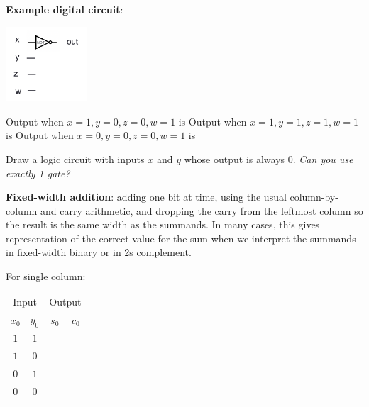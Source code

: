 \documentclass[12pt, oneside]{article}
\begin{document}
\vspace{-40pt}

{\bf Example digital circuit}: 

\begin{multicols}{2}
\begin{center}
   \includegraphics[width=1.2in]{../Resources/images/circuitEx.png} 
\end{center}
\columnbreak
Output when $x=1, y=0, z=0, w = 1$ is \underline{\phantom{$~~~0~~~$}}
Output when $x=1, y=1, z=1, w = 1$ is \underline{\phantom{$~~~0~~~$}}
Output when $x=0, y=0, z=0, w = 1$ is \underline{\phantom{$~~~0~~~$}}
\end{multicols}



Draw a logic circuit with inputs $x$ and $y$ whose output  is always $0$.  {\it  Can you use exactly 1 gate?}


\vspace{40pt}

{\bf Fixed-width addition}: adding one bit at time, using the usual column-by-column and carry arithmetic, and dropping the carry from the leftmost column so the result is the same width as the summands.  In many cases, this gives representation of the correct value for the sum when we interpret the summands
in fixed-width binary or in 2s complement.

For single column:
\begin{center}
\begin{tabular}{cc|cc}
\multicolumn{2}{c|}{Input}  & \multicolumn{2}{|c}{Output}  \\
$x_0$ & $y_0$ & $s_0$ & $c_0$  \\
\hline
$1$ & $1$ & \phantom{$0$} & \phantom{$1$} \\
$1$ & $0$ & \phantom{$1$} & \phantom{$0$}\\
$0$ & $1$ & \phantom{$1$} & \phantom{$0$}\\
$0$ & $0$ & \phantom{$0$} & \phantom{$0$}\\
\end{tabular}
\end{center}
\end{document}

